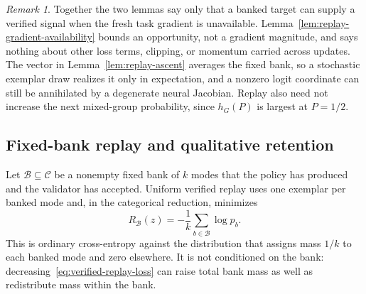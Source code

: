 \documentclass{article}
\newcommand{\1}{\mathbf 1}
\theoremstyle{remark}
\newtheorem{remark}[lemma]{Remark}
\theoremstyle{definition}
\theoremstyle{plain}
\begin{document}
\begin{remark}
Together the two lemmas say only that a banked target can supply a verified
signal when the fresh task gradient is unavailable. Lemma~\ref{lem:replay-gradient-availability}
bounds an opportunity, not a gradient magnitude, and says nothing about other
loss terms, clipping, or momentum carried across updates. The vector in
Lemma~\ref{lem:replay-ascent} averages the fixed bank, so a stochastic
exemplar draw realizes it only in expectation, and a nonzero logit coordinate
can still be annihilated by a degenerate neural Jacobian. Replay also need not
increase the next mixed-group probability, since $h_G(P)$ is largest at
$P=1/2$.
\end{remark}

\subsection{Fixed-bank replay and qualitative retention}
\label{app:theory-replay}

Let $\mathcal B\subseteq\mathcal C$ be a nonempty fixed bank of $k$ modes that
the policy has produced and the validator has accepted. Uniform verified replay
uses one exemplar per banked mode and, in the categorical reduction, minimizes
\begin{equation}
  R_{\mathcal B}(z)
  =-\frac1k\sum_{b\in\mathcal B}\log p_b.
  \label{eq:verified-replay-loss}
\end{equation}
This is ordinary cross-entropy against the distribution that assigns mass
$1/k$ to each banked mode and zero elsewhere. It is not conditioned on the
bank: decreasing~\eqref{eq:verified-replay-loss} can raise total bank mass as
well as redistribute mass within the bank.
\end{document}
